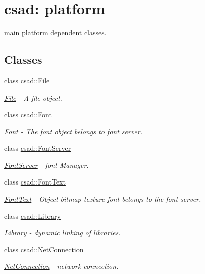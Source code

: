 \hypertarget{group__platform}{\section{csad\-: platform}
\label{group__platform}
}


main platform dependent classes.  


\subsection*{Classes}
\begin{DoxyCompactItemize}
\item 
class \hyperlink{classcsad_1_1_file}{csad\-::\-File}
\begin{DoxyCompactList}\small\item\em \hyperlink{classcsad_1_1_file}{File} -\/ A file object. \end{DoxyCompactList}\item 
class \hyperlink{classcsad_1_1_font}{csad\-::\-Font}
\begin{DoxyCompactList}\small\item\em \hyperlink{classcsad_1_1_font}{Font} -\/ The font object belongs to font server. \end{DoxyCompactList}\item 
class \hyperlink{classcsad_1_1_font_server}{csad\-::\-Font\-Server}
\begin{DoxyCompactList}\small\item\em \hyperlink{classcsad_1_1_font_server}{Font\-Server} -\/ font Manager. \end{DoxyCompactList}\item 
class \hyperlink{classcsad_1_1_font_text}{csad\-::\-Font\-Text}
\begin{DoxyCompactList}\small\item\em \hyperlink{classcsad_1_1_font_text}{Font\-Text} -\/ Object bitmap texture font belongs to the font server. \end{DoxyCompactList}\item 
class \hyperlink{classcsad_1_1_library}{csad\-::\-Library}
\begin{DoxyCompactList}\small\item\em \hyperlink{classcsad_1_1_library}{Library} -\/ dynamic linking of libraries. \end{DoxyCompactList}\item 
class \hyperlink{classcsad_1_1_net_connection}{csad\-::\-Net\-Connection}
\begin{DoxyCompactList}\small\item\em \hyperlink{classcsad_1_1_net_connection}{Net\-Connection} -\/ network connection. \end{DoxyCompactList}\item 

\end{DoxyCompactItemize}
